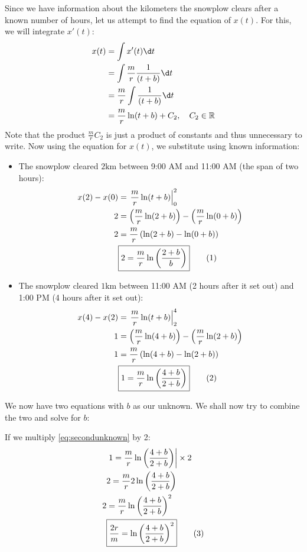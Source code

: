 \documentclass[a4paper,12pt]{article}
\newcommand\numberthis{\addtocounter{equation}{1}\tag{\theequation}}
\begin{document}
    Since we have information about the kilometers the snowplow clears after a known number of hours, let us attempt to find the equation of $x(t)$. For this, we will integrate $x'(t)$:
    \begin{align*}
        x(t) &= \int x'(t) \d t \\ 
        &= \int \frac{m}{r} \frac{1}{(t+b)} \d t \\
        &= \frac{m}{r} \int \frac{1}{(t+b)} \d t \\
        &= \frac{m}{r} \ln(t+b) + C_2, \quad C_2 \in \mathbb{R}
    \end{align*}
    Note that the product $\frac{m}{r}C_2$ is just a product of constants and thus unnecessary to write.
    Now using the equation for $x(t)$, we substitute using known information:
    \begin{itemize}
        \item The snowplow cleared $2 \unit{\kilo\meter}$ between 9:00 AM and 11:00 AM (the span of two hours):
        \begin{align*}
            x(2) - x(0) &= \left.\frac{m}{r}\ln(t+b)\right|^2_0 \\
            2 &= \left(\frac{m}{r} \ln(2+b)\right) - \left(\frac{m}{r}\ln(0+b)\right) \\
            2 &= \frac{m}{r} \left(\ln(2+b) - \ln(0+b)\right) \\
            &\boxed{2 = \frac{m}{r} \ln\left(\frac{2+b}{b}\right)} \numberthis \label{eq:firstunknown}
        \end{align*}
        \item The snowplow cleared $1 \unit{\kilo\meter}$ between 11:00 AM (2 hours after it set out) and 1:00 PM (4 hours after it set out):
        \begin{align*}
            x(4) - x(2) &= \left.\frac{m}{r}\ln(t+b)\right|^4_2 \\
            1 &= \left(\frac{m}{r} \ln(4+b)\right) - \left(\frac{m}{r}\ln(2+b)\right) \\
            1 &= \frac{m}{r} \left(\ln(4+b) - \ln(2+b)\right) \\
            &\boxed{1 = \frac{m}{r} \ln\left(\frac{4+b}{2+b}\right)} \numberthis \label{eq:secondunknown}
        \end{align*}
    \end{itemize}

    We now have two equations with $b$ as our unknown. We shall now try to combine the two and solve for $b$:

    If we multiply \eqref{eq:secondunknown} by 2:
    \begin{align*}
        &\left.1 = \frac{m}{r} \ln\left(\frac{4+b}{2+b}\right)\right|\times 2 \\
        &2 = \frac{m}{r} 2 \ln\left(\frac{4+b}{2+b}\right) \\
        2 &= \frac{m}{r} \ln\left(\frac{4+b}{2+b}\right)^2 \\
        &\boxed{\frac{2r}{m} = \ln\left(\frac{4+b}{2+b}\right)^2} \label{eq:thirdunknown} \numberthis
    \end{align*}
\end{document}
